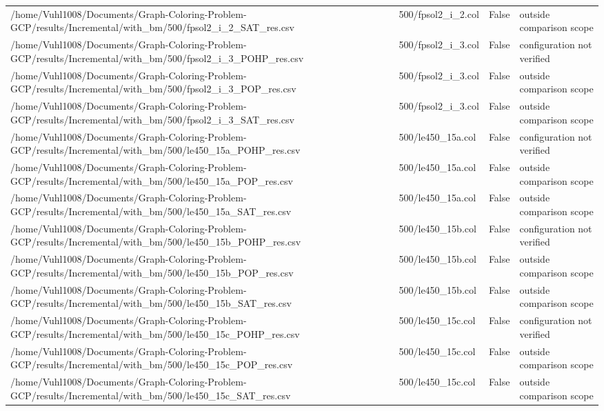 \begin{table}[htbp]
\begin{tabular}{llll}
/home/Vuhl1008/Documents/Graph-Coloring-Problem-GCP/results/Incremental/with\_bm/500/fpsol2\_i\_2\_SAT\_res.csv & 500/fpsol2\_i\_2.col & False & outside comparison scope \\
/home/Vuhl1008/Documents/Graph-Coloring-Problem-GCP/results/Incremental/with\_bm/500/fpsol2\_i\_3\_POHP\_res.csv & 500/fpsol2\_i\_3.col & False & configuration not verified \\
/home/Vuhl1008/Documents/Graph-Coloring-Problem-GCP/results/Incremental/with\_bm/500/fpsol2\_i\_3\_POP\_res.csv & 500/fpsol2\_i\_3.col & False & outside comparison scope \\
/home/Vuhl1008/Documents/Graph-Coloring-Problem-GCP/results/Incremental/with\_bm/500/fpsol2\_i\_3\_SAT\_res.csv & 500/fpsol2\_i\_3.col & False & outside comparison scope \\
/home/Vuhl1008/Documents/Graph-Coloring-Problem-GCP/results/Incremental/with\_bm/500/le450\_15a\_POHP\_res.csv & 500/le450\_15a.col & False & configuration not verified \\
/home/Vuhl1008/Documents/Graph-Coloring-Problem-GCP/results/Incremental/with\_bm/500/le450\_15a\_POP\_res.csv & 500/le450\_15a.col & False & outside comparison scope \\
/home/Vuhl1008/Documents/Graph-Coloring-Problem-GCP/results/Incremental/with\_bm/500/le450\_15a\_SAT\_res.csv & 500/le450\_15a.col & False & outside comparison scope \\
/home/Vuhl1008/Documents/Graph-Coloring-Problem-GCP/results/Incremental/with\_bm/500/le450\_15b\_POHP\_res.csv & 500/le450\_15b.col & False & configuration not verified \\
/home/Vuhl1008/Documents/Graph-Coloring-Problem-GCP/results/Incremental/with\_bm/500/le450\_15b\_POP\_res.csv & 500/le450\_15b.col & False & outside comparison scope \\
/home/Vuhl1008/Documents/Graph-Coloring-Problem-GCP/results/Incremental/with\_bm/500/le450\_15b\_SAT\_res.csv & 500/le450\_15b.col & False & outside comparison scope \\
/home/Vuhl1008/Documents/Graph-Coloring-Problem-GCP/results/Incremental/with\_bm/500/le450\_15c\_POHP\_res.csv & 500/le450\_15c.col & False & configuration not verified \\
/home/Vuhl1008/Documents/Graph-Coloring-Problem-GCP/results/Incremental/with\_bm/500/le450\_15c\_POP\_res.csv & 500/le450\_15c.col & False & outside comparison scope \\
/home/Vuhl1008/Documents/Graph-Coloring-Problem-GCP/results/Incremental/with\_bm/500/le450\_15c\_SAT\_res.csv & 500/le450\_15c.col & False & outside comparison scope \\

\end{tabular}
\end{table}
